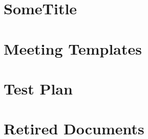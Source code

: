 \documentclass{article}
\begin{document}
\renewcommand{\thepage}{\roman{page}}




\newpage


\newpage
\setcounter{page}{1}
\renewcommand{\thepage}{\arabic{page}}

\newpage


\newpage


\newpage


\newpage


\newpage


\newpage


\newpage


\newpage


\newpage


\newpage


\newpage


\newpage


\appendix

\newpage
\section{SomeTitle}

\newpage


\newpage
\section{Meeting Templates}

\newpage


\newpage
\section{Test Plan}

\newpage


\newpage
\section{Retired Documents}

\newpage


\newpage


\newpage


\newpage

\end{document}
